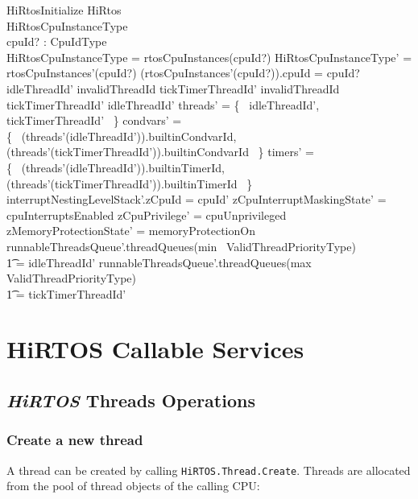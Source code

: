 \documentclass[11pt,letterpaper,twoside,openany]{book}
\begin{document}
\begin{schema}{HiRtosInitialize}
   \Delta HiRtos \\
   \Delta HiRtosCpuInstanceType \\
   cpuId? : CpuIdType \\
\where
   \theta HiRtosCpuInstanceType = rtosCpuInstances(cpuId?)
\also
   \theta HiRtosCpuInstanceType' = rtosCpuInstances'(cpuId?)
\also
   (rtosCpuInstances'(cpuId?)).cpuId = cpuId?
\also
    idleThreadId' \neq invalidThreadId
\also
    tickTimerThreadId' \neq invalidThreadId
\also
    tickTimerThreadId' \neq idleThreadId'
\also
    \dom threads' = \{~ idleThreadId', tickTimerThreadId' ~\}
\also
    \dom condvars' = \\
   \{~ (threads'(idleThreadId')).builtinCondvarId, \\
      (threads'(tickTimerThreadId')).builtinCondvarId ~\}
\also
    \dom timers' = \\
   \{~ (threads'(idleThreadId')).builtinTimerId, \\
       (threads'(tickTimerThreadId')).builtinTimerId ~\}
\also
   interruptNestingLevelStack'.zCpuId = cpuId'
\also
    zCpuInterruptMaskingState' = cpuInterruptsEnabled
\also
    zCpuPrivilege' = cpuUnprivileged
\also
    zMemoryProtectionState' = memoryProtectionOn
\also
    runnableThreadsQueue'.threadQueues(min~ ValidThreadPriorityType) \\
    \t1 = \langle idleThreadId' \rangle
\also
    runnableThreadsQueue'.threadQueues(max~ ValidThreadPriorityType) \\
    \t1 = \langle tickTimerThreadId' \rangle
\end{schema}

\section{HiRTOS Callable Services}

\subsection{\emph{HiRTOS} Threads Operations}

\subsubsection{Create a new thread}

A thread can be created by calling \verb`HiRTOS.Thread.Create`. Threads are allocated from the pool of
thread objects of the calling CPU:
\end{document}
